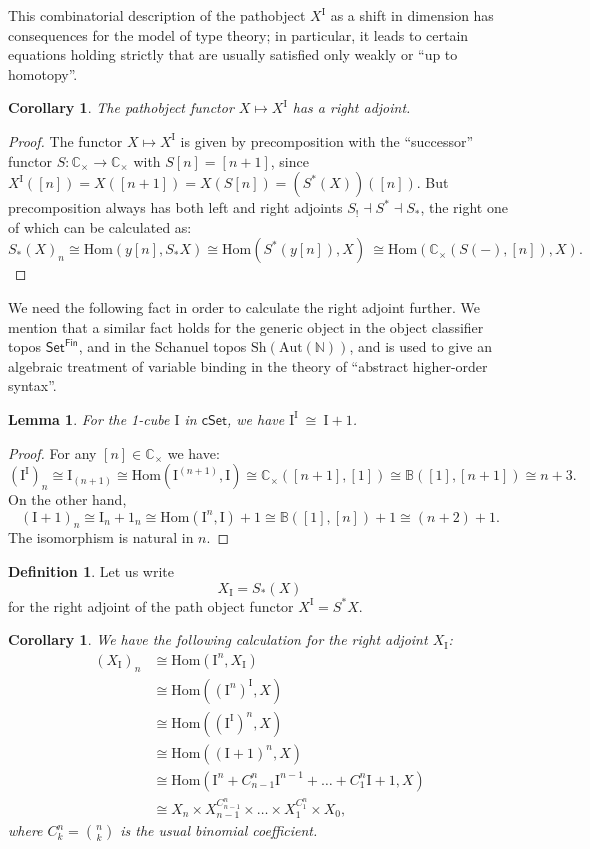 \documentclass[12pt]{article}
\newcommand{\Cc}{\ensuremath{\mathbb{C}_\times}}
\newcommand{\B}{\ensuremath{\mathbb{B}}}
\newcommand{\N}{\ensuremath{\mathbb{N}}}
\newcommand{\Set}{\ensuremath{\mathsf{Set}}}
\newcommand{\cSet}{\ensuremath{\mathsf{cSet}}}
\newcommand{\Hom}{\ensuremath{\mathrm{Hom}}}
\renewcommand{\hom}{\ensuremath{\mathrm{Hom}}}
\newcommand{\I}{\ensuremath{\mathrm{I}}}
\newtheorem{lemma}[theorem]{Lemma}
\newtheorem{corollary}[theorem]{Corollary}
\theoremstyle{remark}
\theoremstyle{definition}
\newtheorem{definition}[theorem]{Definition}
\begin{document}
This combinatorial description of the pathobject $X^\I$ as a shift in dimension has consequences for the model of type theory; in particular, it  leads to certain equations holding strictly that are usually satisfied only weakly or ``up to homotopy''.

\begin{corollary}\label{cor:rightadjpath}
The pathobject functor $X \mapsto X^\I$ has a \emph{right} adjoint.
\end{corollary}
\begin{proof}
The functor $X \mapsto X^\I$ is given by precomposition with the ``successor'' functor $S : \Cc\to\Cc$ with $S[n] = [n+1]$, since $X^\I([n]) = X([n+1]) = X(S[n]) = (S^*(X))([n])$.  But precomposition always has both left and right adjoints $S_! \dashv S^* \dashv S_*$, the right one of which can be calculated as:
\[
S_*(X)_n \cong \hom(y[n], S_*X) \cong \hom(S^*(y[n]), X)\ \cong \hom(\Cc(S(-), [n]), X).
\]
\end{proof}

We need the following fact in order to calculate the right adjoint further. We mention that a similar fact holds for the generic object in the object classifier topos $\Set^{\mathsf{Fin}}$, and in the Schanuel topos $\mathrm{Sh}(\mathrm{Aut}(\N))$, and is used to give an algebraic treatment of variable binding in the theory of ``abstract higher-order syntax''.

\begin{lemma}\label{lemma:binomial}
For the 1-cube $\I$ in $\cSet$, we have $\I^\I\ \cong\ \I+1$.
\end{lemma}
\begin{proof}
For any $[n] \in \Cc$ we have:
\[
(\I^\I)_n \cong \I_{(n+1)} \cong \Hom(\I^{(n+1)},\I)\cong \Cc([n+1],[1])\cong \B([1], [n+1])\cong n+3.
\]
On the other hand,
\[
(\I+1)_n \cong \I_n + 1_n \cong \Hom(\I^n, \I) + 1 \cong \B([1],[n]) +1 \cong (n+2) +1.
\]
The isomorphism is natural in $n$.
\end{proof}
%

\begin{definition}
Let us write
\[
X_\I = S_*(X)
\]
for the right adjoint of the path object functor $X^\I = S^*X$.
\end{definition}

\begin{corollary}
We have the following calculation for the right adjoint $X_\I$:
\begin{align*}
(X_\I)_n &\cong \hom(\I^n, X_\I) \\
&\cong \hom((\I^n)^\I, X) \\
&\cong \hom((\I^\I)^n, X) \\
&\cong \hom((\I+1)^n, X) \\
&\cong \hom(\I^n + C^n_{n-1}\I^{n-1} + \dots + C^n_{1}\I+1, X) \\
&\cong X_n \times X_{n-1}^{C^n_{n-1}} \times \dots \times X_1^{C^n_{1}}\times X_0,
\end{align*}
where $C^n_{k} = \binom{n}{k}$ is the usual binomial coefficient.
\end{corollary}
\end{document}
